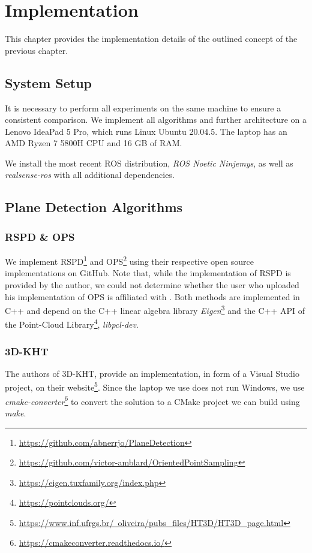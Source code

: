 \documentclass[main.tex]{subfiles}
\begin{document}
\chapter{Implementation}
This chapter provides the implementation details of the outlined concept of the previous chapter.
\section{System Setup}
It is necessary to perform all experiments on the same machine to ensure a consistent comparison.
We implement all algorithms and further architecture on a Lenovo IdeaPad 5 Pro,
which runs Linux Ubuntu 20.04.5. The laptop has an AMD Ryzen 7 5800H CPU and 16 GB of RAM.

We install the most recent ROS distribution, \textit{ROS Noetic Ninjemys}, as well as \textit{realsense-ros} with all additional dependencies.



\section{Plane Detection Algorithms}
\subsection{RSPD \& OPS}
We implement RSPD\footnote{\href{https://github.com/abnerrjo/PlaneDetection}{https://github.com/abnerrjo/PlaneDetection}} and OPS\footnote{\href{https://github.com/victor-amblard/OrientedPointSampling}{https://github.com/victor-amblard/OrientedPointSampling}} using their respective open source implementations on GitHub.
Note that, while the implementation of RSPD is provided by the author, we could not determine whether the user who uploaded his implementation of OPS is affiliated with \citeauthor{Sun_Mordohai_2019}.
Both methods are implemented in C++ and depend on the C++ linear algebra library \textit{Eigen}\footnote{\href{https://eigen.tuxfamily.org/index.php}{https://eigen.tuxfamily.org/index.php}}
and the C++ API of the  Point-Cloud Library\footnote{\href{https://pointclouds.org/}{https://pointclouds.org/}}, \textit{libpcl-dev}.

\subsection{3D-KHT}

The authors of 3D-KHT, provide an implementation, in form of a Visual Studio project, on their website\footnote{\href{https://www.inf.ufrgs.br/~oliveira/pubs_files/HT3D/HT3D_page.html}
    {https://www.inf.ufrgs.br/~oliveira/pubs\_files/HT3D/HT3D\_page.html}}. Since the laptop we use does not run Windows, we use \textit{cmake-converter}\footnote{\href{https://cmakeconverter.readthedocs.io/en/latest/use.html}{https://cmakeconverter.readthedocs.io/}} to convert
the solution to a CMake project we can build using \textit{make}.
\end{document}

